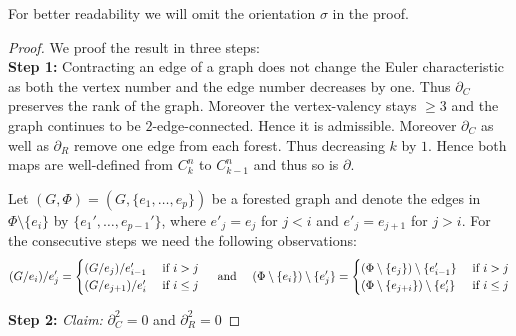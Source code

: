 For better readability we will omit the orientation $\sigma$ in the proof.
\begin{proof}


	We proof the result in three steps:\\
	\textbf{Step 1:} Contracting an edge of a graph does not change the Euler characteristic as both the vertex number and the edge number decreases by one.
	Thus $\partial_{C}$ preserves the rank of the graph. Moreover the vertex-valency stays $\geq 3$ and the graph continues to be $2$-edge-connected.
	Hence it is admissible.
	Moreover $\partial_{C}$ as well as $\partial_{R}$ remove one edge from each forest. Thus decreasing
	$k$ by $1$. Hence both maps are well-defined from $C^{n}_{k}$ to $C^{n}_{k-1}$ and thus so is $\partial$.

	Let $(G,\Phi) = (G, \{e_1,\ldots,e_{p}\})$ be a forested graph and denote the edges in $\Phi \setminus \{e_{i}\}$ by $\{e_1',\ldots,e_{p-1}'\}$,
	where $e'_{j} = e_{j}$ for $j < i$ and $e'_{j} = e_{j+1}$ for $j > i$.
	For the consecutive steps we need the following observations:
	\[
		(G / e_{i}) /  e_{j}' = \begin{cases}
			(G / e_{j}) / e_{i-1}' & \text{ if } i > j\\
			(G / e_{j+1}) / e_{i}' & \text{ if } i \leq j
		\end{cases}
		\qq{ and }
		(\Phi \setminus \{e_{i}\}) \setminus \{e_{j}'\}  = \begin{cases}	
			(\Phi \setminus \{e_{j}\}) \setminus \{e_{i-1}'\} & \text{ if } i > j\\
			(\Phi \setminus \{e_{j+i}\}) \setminus \{e_{i}'\} & \text{ if } i \leq j
		\end{cases}
	\]

	\textbf{Step 2:}\enskip
	\emph{Claim:}
		$\partial_{C}^2 = 0$ and $\partial_{R}^2 = 0$


\end{proof}
